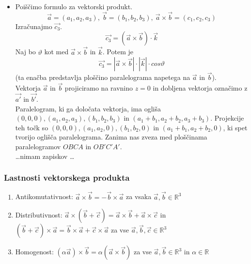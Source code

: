 \documentclass[a4paper,12pt]{article}
\begin{document}
\begin{itemize}
\item Poiščimo formulo za vektorski produkt.
$$ \vec{a} = (a_1, a_2, a_3), ~ \vec{b} = (b_1, b_2, b_3), ~ \vec{a} \times \vec{b} = (c_1, c_2, c_3)$$
Izračunajmo $ \vec{c_3} $.
$$ \vec{c_3} = (\vec{a} \times \vec{b}) \cdot \vec{k} $$
Naj bo $\vartheta$ kot med $\vec{a} \times \vec{b}$ in $\vec{k}$. Potem je 
$$ \vec{c_3} = | \vec{a} \times \vec{b} | \cdot |\vec{k}| \cdot cos\vartheta $$
(ta enačba predstavlja ploščino paralelograma napetega na $\vec{a}$ in $\vec{b}$).\\

Vektorja $\vec{a}$ in $ \vec{b}$ projiciramo na ravnino $z=0$ in dobljena vektorja označimo z $\vec{a'}$ in $\vec{b'}$.\\

Paralelogram, ki ga določata vektorja, ima ogliša $(0,0,0), (a_1, a_2, a_3), (b_1, b_2, b_3)$ in $ (a_1 + b_1, a_2 + b_2, a_3 + b_3)$. Projekcije teh točk so $(0,0,0), (a_1, a_2, 0), (b_1, b_2, 0)$ in $ (a_1 + b_1, a_2 + b_2, 0)$, ki spet tvorijo oglišča paralelograma. Zanima nas zveza med ploščinama paralelogramov $OBCA$ in $OB'C'A'$. \\

\ldots nimam zapiskov \ldots 
\end{itemize}

\newpage

\begin{center}
\subsubsection{Lastnosti vektorskega produkta}
\end{center}

\begin{enumerate}
\item Antikomutativnost: $ \vec{a} \times \vec{b} = - \vec{b} \times \vec{a}$ za vsaka $\vec{a}, \vec{b} \in \mathbb{R}^3$
\item Distributivnost: $ \vec{a} \times (\vec{b} + \vec{c}) = \vec{a} \times \vec{b} + \vec{a} \times \vec{c}$ in $(\vec{b} + \vec{c}) \times \vec{a} = \vec{b} \times \vec{a} + \vec{c} \times \vec{a}$ za vse $ \vec{a}, \vec{b}, \vec{c} \in \mathbb{R}^3$
\item Homogenost: $(\alpha \vec{a}) \times \vec{b} = \alpha ( \vec{a} \times \vec{b}) $ za vse $\vec{a}, \vec{b} \in \mathbb{R}^3$ in $\alpha \in \mathbb{R}$
\end{enumerate}
\end{document}
